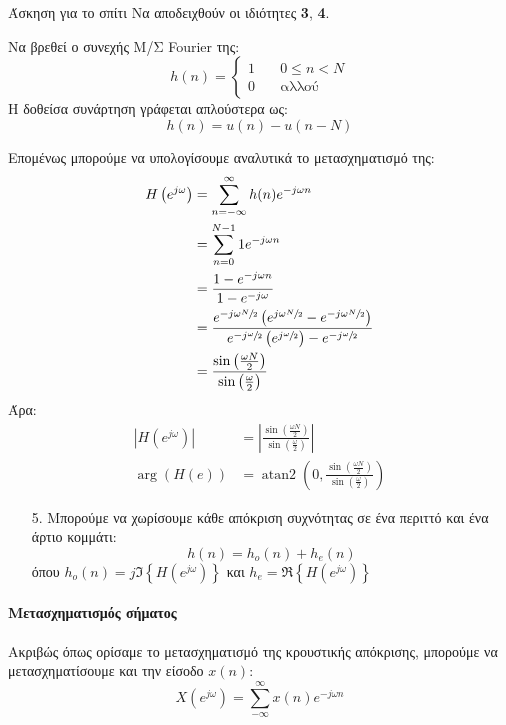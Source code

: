 \documentclass[11pt,a4paper,notitlepage,fleqn]{article}
\begin{document}
\begin{questionbox}{Άσκηση για το σπίτι}
	Να αποδειχθούν οι ιδιότητες \textbf{3}, \textbf{4}.
\end{questionbox}

\begin{exercise}
	Να βρεθεί ο συνεχής Μ/Σ Fourier της:
	\[
	h(n) = \begin{cases}
	1 & \quad 0 \leq n < N\\
	0 & \quad \text{αλλού}
	\end{cases}
	\]
	\tcblower
	Η δοθείσα συνάρτηση γράφεται απλούστερα ως:
	\[
	h(n) = u(n) - u(n-N)
	\]
	
	Επομένως μπορούμε να υπολογίσουμε αναλυτικά το μετασχηματισμό της:
	\begin{align*}
		H\left(e^{j\omega }\right)
		&= \sum_{n=-\infty}^{\infty} h(n) e^{-j\omega n}
		\\ &= \sum_{n=0}^{N-1} 1 e^{-j\omega n}
		\\ &= \frac{1-e^{-j\omega n}}{1-e^{-j\omega }}
		\\ &= \frac
		{
			e^{-j\omega \sfrac{N}{2} } 
			\left(
				e^{j\omega \sfrac{N}{2} }-e^{-j\omega \sfrac{N}{2} }
			\right)
		}
		{ 
			e^{-j\sfrac{\omega }{2} }  
			\left( e^{j\sfrac{\omega }{2}  }\right)
			-e^{-j\sfrac{\omega }{2} 	}
		}
	\\ &= 	\frac{\sin\left(\frac{\omega N}{2}\right)}{\sin\left(\frac{\omega}{2}\right)}
	\end{align*}
	Άρα:
	\begin{align*}
		\left|H\left(e^{j\omega }\right)\right|
		 &= \left|
		\frac{\sin\left(\frac{\omega N}{2}\right)}{\sin\left(\frac{\omega}{2}\right)}
		\right|
		\\
		\arg\left(H\left(e\right)\right) &= \mathop{atan2}\left(0, \frac{\sin\left(\frac{\omega N}{2}\right)}{\sin\left(\frac{\omega}{2}\right)}\right)
	\end{align*}
\end{exercise}

\begin{enumerate}
	\item[5.]
	Μπορούμε να χωρίσουμε κάθε απόκριση συχνότητας σε ένα περιττό και ένα άρτιο κομμάτι:
	\[
	h(n) = h_o(n) + h_e(n)
	\]
	όπου \( h_o(n) = j\Im \left\lbrace H\left(e^{j\omega }\right)\right\rbrace \)
	και \( h_e = \Re\left\lbrace H\left(e^{j\omega }\right) \right\rbrace \)
\end{enumerate}

\paragraph{Μετασχηματισμός σήματος}
Ακριβώς όπως ορίσαμε το μετασχηματισμό της κρουστικής απόκρισης, μπορούμε να μετασχηματίσουμε
και την είσοδο \( x(n) \):
\[
X\left(e^{j\omega }\right) = \sum_{-\infty}^{\infty} x(n)e^{-j\omega n}
\]
\end{document}
